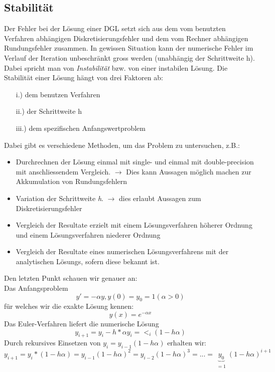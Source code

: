 \documentclass{article}
\theoremstyle{satz}
\theoremstyle{definition}
\begin{document}
\subsection{Stabilität}
Der Fehler bei der Lösung einer DGL setzt sich aus dem vom benutzten Verfahren abhängigen Diskretisierungsfehler und dem vom Rechner abhängigen Rundungsfehler zusammen. In gewissen Situation kann der numerische Fehler im Verlauf der Iteration unbeschränkt gross werden (unabhängig der Schrittweite h). Dabei spricht man von \textit{Instabilität} bzw. von einer instabilen Lösung. Die Stabilität einer Lösung hängt von drei Faktoren ab:
\begin{itemize}
	\item[i.)] dem benutzen Verfahren
	\item[ii.)] der Schrittweite h
	\item[iii.)] dem spezifischen Anfangswertproblem
\end{itemize}
Dabei gibt es verschiedene Methoden, um das Problem zu untersuchen, z.B.:
\begin{itemize}
	\item Durchrechnen der Lösung einmal mit single- und einmal mit double-precision mit anschliessendem Vergleich. $\rightarrow$ Dies kann Aussagen möglich machen zur Akkumulation von Rundungsfehlern
	\item Variation der Schrittweite \textit{h}. $\rightarrow$ dies erlaubt Aussagen zum Diskretisierungsfehler
	\item Vergleich der Resultate erzielt mit einem Lösungsverfahren höherer Ordnung und einem Lösungsverfahren niederer Ordnung
	\item Vergleich der Resultate eines numerischen Lösungsverfahrens mit der analytischen Lösungs, sofern diese bekannt ist.
\end{itemize}
Den letzten Punkt schauen wir genauer an:\\
Das Anfangsproblem
\begin{equation}
	y' = -\alpha y, y(0) = y_0 = 1 (\alpha > 0)
\end{equation}
für welches wir die exakte Lösung kennen:
\begin{equation}
y(x)= e^{-\alpha x}
\end{equation}
Das Euler-Verfahren liefert die numerische Lösung
\begin{equation}
	y_{i+1} = y_i - h * \alpha y_i = <_i(1-h \alpha)
\end{equation}
Durch rekursives Einsetzen von $y_i = y_{i-1} (1-h\alpha)$ erhalten wir:
\begin{equation}
y_{i+1} = y_i * (1-h\alpha) = y_{i-1} (1-h\alpha)^2 = y_{i-2}(1-h\alpha)^3 = ... = \underbrace{y_0}_{\substack{=1}}(1-h\alpha)^{i+1}
\end{equation}
\end{document}
